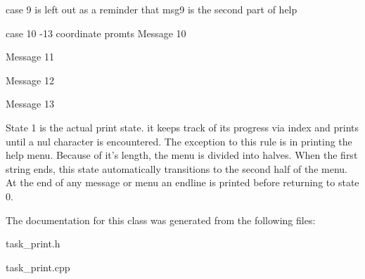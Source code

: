 case 9 is left out as a reminder that msg9 is the second part of help

case 10 -\/13 coordinate promts Message 10

Message 11

Message 12

Message 13

State 1 is the actual print state. it keeps track of its progress via index and prints until a nul character is encountered. The exception to this rule is in printing the help menu. Because of it's length, the menu is divided into halves. When the first string ends, this state automatically transitions to the second half of the menu. At the end of any message or menu an endline is printed before returning to state 0.

The documentation for this class was generated from the following files\-:\begin{DoxyCompactItemize}
\item 
task\-\_\-print.\-h\item 
task\-\_\-print.\-cpp\end{DoxyCompactItemize}
